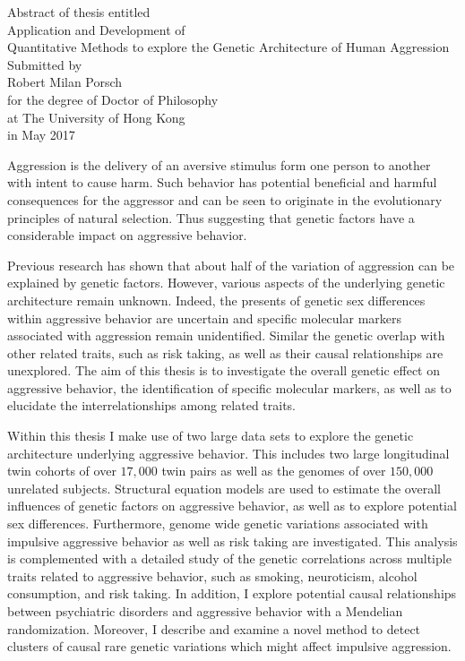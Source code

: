 \documentclass[header.tex]{subfiles}
\begin{document}
\begin{center}
  Abstract of thesis entitled \\
  \vspace*{\baselineskip}
  {\LARGE Application and Development of \\ Quantitative Methods to explore the Genetic Architecture of Human Aggression}\\[0.2\baselineskip]
  \vspace*{\baselineskip}
  Submitted by\\
  \vspace*{\baselineskip}
  {\LARGE Robert Milan Porsch}\\
  \vspace*{\baselineskip}
  for the degree of Doctor of Philosophy \\ at The University of Hong Kong \\ in May 2017
\end{center}


Aggression is the delivery of an aversive stimulus form one person to another with intent to cause harm.
Such behavior has potential beneficial and harmful consequences for the aggressor and can be seen to originate in the evolutionary principles of natural selection.
Thus suggesting that genetic factors have a considerable impact on aggressive behavior.

Previous research has shown that about half of the variation of aggression can be explained by genetic factors.
However, various aspects of the underlying genetic architecture remain unknown.
Indeed, the presents of genetic sex differences within aggressive behavior are uncertain and specific molecular markers associated with aggression remain unidentified.
Similar the genetic overlap with other related traits, such as risk taking, as well as their causal relationships are unexplored.
The aim of this thesis is to investigate the overall genetic effect on aggressive behavior, the identification of specific molecular markers, as well as to elucidate the interrelationships among related traits. 

Within this thesis I make use of two large data sets to explore the genetic architecture underlying aggressive behavior.
This includes two large longitudinal twin cohorts of over $17,000$ twin pairs as well as the genomes of over $150,000$ unrelated subjects. 
Structural equation models are used to estimate the overall influences of genetic factors on aggressive behavior, as well as to explore potential sex differences.
Furthermore, genome wide genetic variations associated with impulsive aggressive behavior as well as risk taking are investigated.
This analysis is complemented with a detailed study of the genetic correlations across multiple traits related to aggressive behavior, such as smoking, neuroticism, alcohol consumption, and risk taking.    
In addition, I explore potential causal relationships between psychiatric disorders and aggressive behavior with a Mendelian randomization. 
Moreover, I describe and examine a novel method to detect clusters of causal rare genetic variations which might affect impulsive aggression. 
\end{document}
